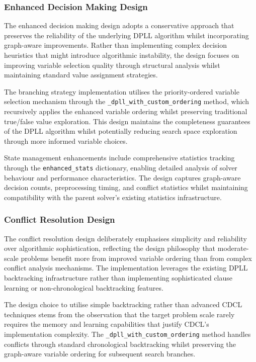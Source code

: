 \subsubsection{Enhanced Decision Making Design}

The enhanced decision making design adopts a conservative approach that preserves the reliability of the underlying DPLL algorithm whilst incorporating graph-aware improvements. Rather than implementing complex decision heuristics that might introduce algorithmic instability, the design focuses on improving variable selection quality through structural analysis whilst maintaining standard value assignment strategies.

The branching strategy implementation utilises the priority-ordered variable selection mechanism through the \texttt{\_dpll\_with\_custom\_ordering} method, which recursively applies the enhanced variable ordering whilst preserving traditional true/false value exploration. This design maintains the completeness guarantees of the DPLL algorithm whilst potentially reducing search space exploration through more informed variable choices.

State management enhancements include comprehensive statistics tracking through the \texttt{enhanced\_stats} dictionary, enabling detailed analysis of solver behaviour and performance characteristics. The design captures graph-aware decision counts, preprocessing timing, and conflict statistics whilst maintaining compatibility with the parent solver's existing statistics infrastructure.

\subsubsection{Conflict Resolution Design}

The conflict resolution design deliberately emphasises simplicity and reliability over algorithmic sophistication, reflecting the design philosophy that moderate-scale problems benefit more from improved variable ordering than from complex conflict analysis mechanisms. The implementation leverages the existing DPLL backtracking infrastructure rather than implementing sophisticated clause learning or non-chronological backtracking features.

The design choice to utilise simple backtracking rather than advanced CDCL techniques stems from the observation that the target problem scale rarely requires the memory and learning capabilities that justify CDCL's implementation complexity. The \texttt{\_dpll\_with\_custom\_\-ordering} method handles conflicts through standard chronological backtracking whilst preserving the graph-aware variable ordering for subsequent search branches.

